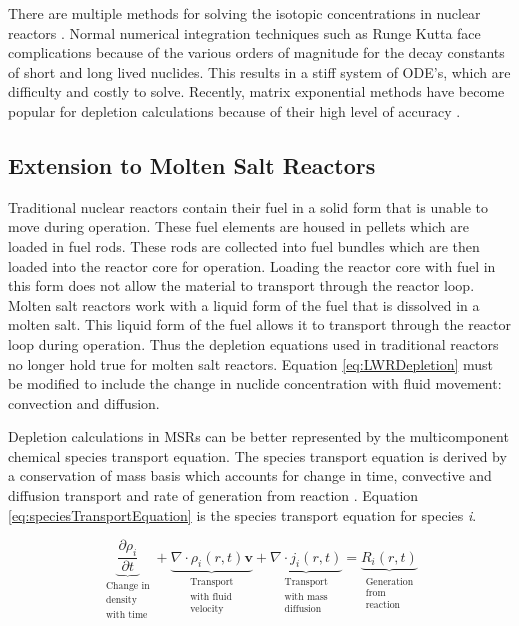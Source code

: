 There are multiple methods for solving the isotopic concentrations in nuclear reactors \cite{isotalo2011} \cite{pusa2010} \cite{akio2007}. Normal numerical integration techniques such as Runge Kutta face complications because of the various orders of magnitude for the decay constants of short and long lived nuclides. This results in a stiff system of ODE's, which are difficulty and costly to solve. Recently, matrix exponential methods have become popular for depletion calculations because of their high level of accuracy \cite{pusaThesis} \cite{aarnoThesis}. 

\subsection{Extension to Molten Salt Reactors}
Traditional nuclear reactors contain their fuel in a solid form that is unable to move during operation. These fuel elements are housed in pellets which are loaded in fuel rods. These rods are collected into fuel bundles which are then loaded into the reactor core for operation. Loading the reactor core with fuel in this form does not allow the material to transport through the reactor loop. Molten salt reactors work with a liquid form of the fuel that is dissolved in a molten salt. This liquid form of the fuel allows it to transport through the reactor loop during operation. Thus the depletion equations used in traditional reactors no longer hold true for molten salt reactors. Equation \ref{eq:LWRDepletion} must be modified to include the change in nuclide concentration with fluid movement: convection and diffusion. 

Depletion calculations in MSRs can be better represented by the multicomponent chemical species transport equation. The species transport equation is derived by a conservation of mass basis which accounts for change in time, convective and diffusion transport and rate of generation from reaction \cite{bird2006}. Equation \ref{eq:speciesTransportEquation} is the species transport equation for species \textit{i}. 

\begin{equation}
    \underbrace{\frac{\partial \rho_{i}}{\partial t}}_{\substack{\text{Change in} \\
    \text{density} \\
    \text{with time}}} + 
    \underbrace{\nabla \cdot \rho_{i}(r,t)\boldsymbol{v}}_{\substack{\text{Transport} \\
    \text{with fluid} \\
    \text{velocity}}}
    + \underbrace{\nabla \cdot j_{i}(r,t)}_{\substack{\text{Transport} \\
    \text{with mass} \\
    \text{diffusion}}} = 
    \underbrace{R_{i}(r,t)}_{\substack{\text{Generation} \\
    \text{from} \\
    \text{reaction}}}
    \label{eq:speciesTransportEquation}
\end{equation}

